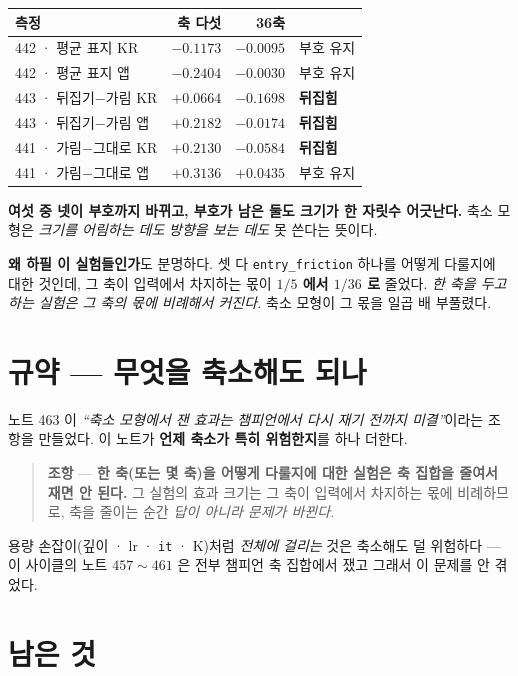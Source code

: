 \documentclass[11pt]{article}
\begin{document}
\begin{center}
\begin{tabular}{lrrl}
\hline
측정 & 축 다섯 & 36축 & \\
\hline
442 · 평균 표지 KR & $-0.1173$ & $-0.0095$ & 부호 유지 \\
442 · 평균 표지 앱 & $-0.2404$ & $-0.0030$ & 부호 유지 \\
443 · 뒤집기$-$가림 KR & $+0.0664$ & $-0.1698$ & \textbf{뒤집힘} \\
443 · 뒤집기$-$가림 앱 & $+0.2182$ & $-0.0174$ & \textbf{뒤집힘} \\
441 · 가림$-$그대로 KR & $+0.2130$ & $-0.0584$ & \textbf{뒤집힘} \\
441 · 가림$-$그대로 앱 & $+0.3136$ & $+0.0435$ & 부호 유지 \\
\hline
\end{tabular}
\end{center}

\textbf{여섯 중 넷이 부호까지 바뀌고, 부호가 남은 둘도 크기가 한 자릿수
어긋난다.} 축소 모형은 \emph{크기를 어림하는 데도} \emph{방향을 보는
데도} 못 쓴다는 뜻이다.

\textbf{왜 하필 이 실험들인가}도 분명하다. 셋 다 \texttt{entry\_friction}
하나를 어떻게 다룰지에 대한 것인데, 그 축이 입력에서 차지하는 몫이
\textbf{$1/5$ 에서 $1/36$ 로} 줄었다. \emph{한 축을 두고 하는 실험은
그 축의 몫에 비례해서 커진다.} 축소 모형이 그 몫을 일곱 배 부풀렸다.

\section*{규약 --- 무엇을 축소해도 되나}

노트 463 이 \emph{``축소 모형에서 잰 효과는 챔피언에서 다시 재기 전까지
미결''}이라는 조항을 만들었다. 이 노트가 \textbf{언제 축소가 특히
위험한지}를 하나 더한다.

\begin{quote}
\textbf{조항} --- \textbf{한 축(또는 몇 축)을 어떻게 다룰지에 대한
실험은 축 집합을 줄여서 재면 안 된다.} 그 실험의 효과 크기는 그 축이
입력에서 차지하는 몫에 비례하므로, 축을 줄이는 순간 \emph{답이 아니라
문제가 바뀐다.}
\end{quote}

용량 손잡이(깊이 · lr · \texttt{it} · K)처럼 \emph{전체에 걸리는} 것은
축소해도 덜 위험하다 --- 이 사이클의 노트 $457 \sim 461$ 은 전부
챔피언 축 집합에서 쟀고 그래서 이 문제를 안 겪었다.

\section*{남은 것}
\end{document}
